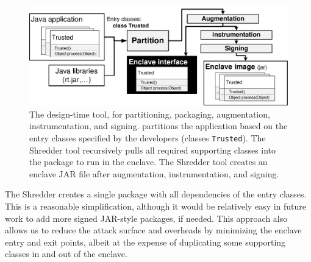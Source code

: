 \begin{figure}[t!]
\centering
\includegraphics[width=5in]{civet/figures/building-tool.pdf}
\caption[Overview of the \sysname{} design-time tool]
{The \sysname{} design-time tool, for partitioning, packaging, augmentation, instrumentation, and signing.
\sysname{} partitions the \java{} application based on the entry classes
specified by the developers (classes {\tt Trusted}).
The Shredder tool recursively pulls all required supporting classes into the 
package to run in the enclave.
The Shredder tool creates an enclave JAR file after augmentation,
instrumentation, and signing.}
\label{fig:civet:builder}
\end{figure}

The Shredder creates a single package with all dependencies of the
entry classes.
This is a reasonable simplification, although 
it would be relatively easy in future work to add more signed JAR-style packages,
if needed.
This approach also allows us to 
reduce the attack surface and overheads by minimizing the 
enclave entry and exit points, albeit at the expense of duplicating some supporting
classes in and out of the enclave.




